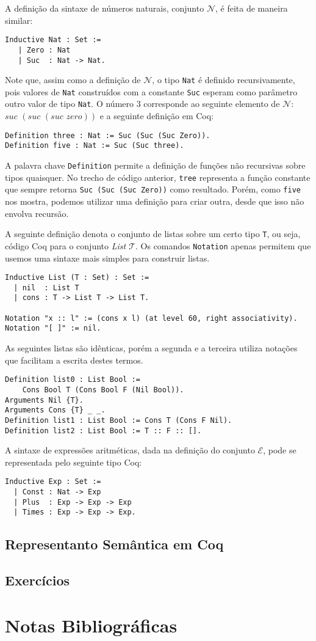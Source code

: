 A defini\c{c}\~ao da sintaxe de n\'umeros naturais, conjunto $\mathcal{N}$, \'e feita de maneira similar:
\begin{lstlisting}
Inductive Nat : Set :=
   | Zero : Nat
   | Suc  : Nat -> Nat.
\end{lstlisting}
Note que, assim como a defini\c{c}\~ao de $\mathcal{N}$, o tipo \texttt{Nat} \'e definido recursivamente, pois valores de \texttt{Nat} 
constru\'idos com a constante \texttt{Suc} esperam como par\^ametro outro valor de tipo \texttt{Nat}. O n\'umero $3$ corresponde ao seguinte
elemento de $\mathcal{N}$: $suc\,\,(suc\,\,(suc\,\,zero))$ e a seguinte defini\c{c}\~ao em Coq:
\begin{lstlisting}
Definition three : Nat := Suc (Suc (Suc Zero)).
Definition five : Nat := Suc (Suc three).
\end{lstlisting}
A palavra chave \texttt{Definition} permite a defini\c{c}\~ao de fun\c{c}\~oes n\~ao recursivas sobre tipos quaisquer. No trecho de c\'odigo
anterior, \texttt{tree} representa a fun\c{c}\~ao constante que sempre retorna \texttt{Suc (Suc (Suc Zero))} como resultado. Por\'em, como
\texttt{five} nos mostra, podemos utilizar uma defini\c{c}\~ao para criar outra, desde que isso n\~ao envolva recurs\~ao.

A seguinte defini\c{c}\~ao denota o conjunto de listas sobre um certo tipo \texttt{T}, ou seja, c\'odigo Coq para o conjunto 
\textit{List $\mathcal{T}$}. Os comandos \texttt{Notation} apenas permitem que usemos uma sintaxe mais simples para construir listas.

\begin{lstlisting}
Inductive List (T : Set) : Set :=
  | nil  : List T
  | cons : T -> List T -> List T.

Notation "x :: l" := (cons x l) (at level 60, right associativity).
Notation "[ ]" := nil.
\end{lstlisting}
As seguintes listas s\~ao id\^enticas, por\'em a segunda e a terceira utiliza nota\c{c}\~oes que facilitam a escrita destes termos.
\begin{lstlisting}
Definition list0 : List Bool := 
    Cons Bool T (Cons Bool F (Nil Bool)).
Arguments Nil {T}.
Arguments Cons {T} _ _.
Definition list1 : List Bool := Cons T (Cons F Nil).
Definition list2 : List Bool := T :: F :: [].
\end{lstlisting}

A sintaxe de express\~oes aritm\'eticas, dada na defini\c{c}\~ao do conjunto $\mathcal{E}$, pode se representada pelo seguinte tipo 
Coq:
\begin{lstlisting}
Inductive Exp : Set :=
  | Const : Nat -> Exp
  | Plus  : Exp -> Exp -> Exp
  | Times : Exp -> Exp -> Exp.
\end{lstlisting}

\subsection{Representanto Sem\^antica em Coq}

\subsection{Exerc\'icios}

\section{Notas Bibliogr\'aficas}